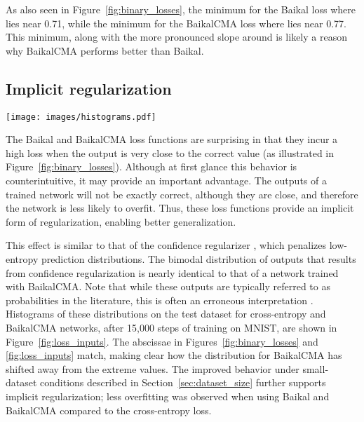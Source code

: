 \documentclass[conference]{IEEEtran}
\begin{document}
As also seen in Figure~\ref{fig:binary_losses}, the minimum for the Baikal loss where  lies near 0.71, while the minimum for the BaikalCMA loss where  lies near 0.77. This minimum, along with the more pronounced slope around  is likely a reason why BaikalCMA performs better than Baikal.


\subsection{Implicit regularization}
\label{sec:implicit_regularization}

\begin{figure*}[t]
  \centering
\texttt{[image: images/histograms.pdf]}
  \caption{Outputs of networks trained with cross-entropy loss and BaikalCMA. With BaikalCMA, the peaks are shifted away from extreme values and more spread out, indicating implicit regularization. The BaikalCMA histogram matches that from a network trained with a confidence regularizer \cite{pereyra2017regularizing}.}
  \label{fig:loss_inputs}
\end{figure*}

The Baikal and BaikalCMA loss functions are surprising in that they incur a high loss when the output is very close to the correct value (as illustrated in Figure~\ref{fig:binary_losses}). Although at first glance this behavior is counterintuitive, it may provide an important advantage. The outputs of a trained network will not be exactly correct, although they are close, and therefore the network is less likely to overfit. Thus, these loss functions provide an implicit form of regularization, enabling better generalization.

This effect is similar to that of the confidence regularizer \cite{pereyra2017regularizing}, which penalizes low-entropy prediction distributions. The bimodal distribution of outputs that results from confidence regularization is nearly identical to that of a network trained with BaikalCMA. Note that while these outputs are typically referred to as probabilities in the literature, this is often an erroneous interpretation \cite{gal2016dropoutbayesian}. Histograms of these distributions on the test dataset for cross-entropy and BaikalCMA networks, after 15,000 steps of training on MNIST, are shown in Figure~\ref{fig:loss_inputs}. The abscissae in Figures~\ref{fig:binary_losses} and \ref{fig:loss_inputs} match, making clear how the distribution for BaikalCMA has shifted away from the extreme values. The improved behavior under small-dataset conditions described in Section~\ref{sec:dataset_size} further supports implicit regularization; less overfitting was observed when using Baikal and BaikalCMA compared to the cross-entropy loss.
\end{document}

